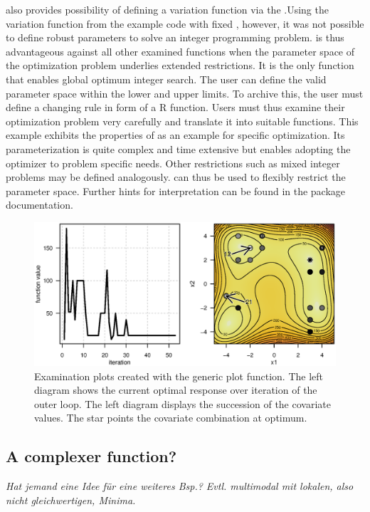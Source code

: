 also provides possibility of defining a variation function via the .Using the variation function from the example code with fixed , however, it was not possible to define robust parameters to solve an integer programming problem.  is thus advantageous against all other examined functions when the parameter space of the optimization problem underlies extended restrictions. It is the only function that enables global optimum integer search. The user can define the valid parameter space within the lower and upper limits. To archive this, the user must define a changing rule in form of a R function. Users must thus examine their optimization problem very carefully and translate it into suitable functions. This example exhibits the properties of  as an example for specific optimization. Its parameterization is quite complex and time extensive but enables adopting the optimizer to problem specific needs. Other restrictions such as mixed integer problems may be defined analogously.  can thus be used to flexibly restrict the parameter space. Further hints for interpretation can be found in the package documentation.

\begin{figure}[htbp]
\centering
\includegraphics[width=1.025\textwidth]{Fig/fig2-ex2-plot.eps}
\caption{Examination plots created with the generic plot function. The left diagram shows the current optimal response over iteration of the outer loop. The left diagram displays the succession of the covariate values. The star points the covariate combination at optimum.}
\label{fig:fig2}
\end{figure}



\subsection{A complexer function?}
\textit{Hat jemand eine Idee für eine weiteres Bsp.? Evtl. multimodal mit lokalen, also nicht gleichwertigen, Minima.}

